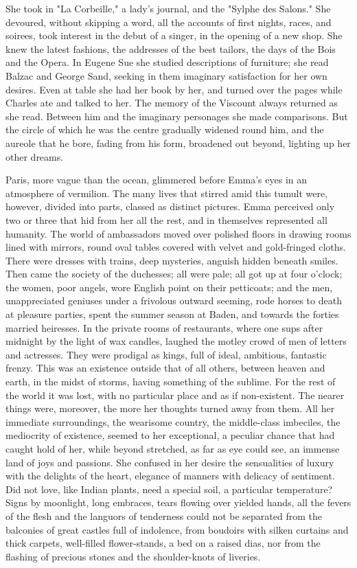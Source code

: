 \documentclass{tufte-book}
\begin{document}
She took in "La Corbeille," a lady's journal, and the "Sylphe des
Salons." She devoured, without skipping a word, all the accounts of
first nights, races, and soirees, took interest in the debut of a
singer, in the opening of a new shop. She knew the latest fashions, the
addresses of the best tailors, the days of the Bois and the Opera. In
Eugene Sue she studied descriptions of furniture; she read Balzac and
George Sand, seeking in them imaginary satisfaction for her own desires.
Even at table she had her book by her, and turned over the pages
while Charles ate and talked to her. The memory of the Viscount always
returned as she read. Between him and the imaginary personages she made
comparisons. But the circle of which he was the centre gradually widened
round him, and the aureole that he bore, fading from his form, broadened
out beyond, lighting up her other dreams.

Paris, more vague than the ocean, glimmered before Emma's eyes in an
atmosphere of vermilion. The many lives that stirred amid this tumult
were, however, divided into parts, classed as distinct pictures. Emma
perceived only two or three that hid from her all the rest, and in
themselves represented all humanity. The world of ambassadors moved over
polished floors in drawing rooms lined with mirrors, round oval tables
covered with velvet and gold-fringed cloths. There were dresses with
trains, deep mysteries, anguish hidden beneath smiles. Then came the
society of the duchesses; all were pale; all got up at four o'clock; the
women, poor angels, wore English point on their petticoats; and the men,
unappreciated geniuses under a frivolous outward seeming, rode horses to
death at pleasure parties, spent the summer season at Baden, and towards
the forties married heiresses. In the private rooms of restaurants,
where one sups after midnight by the light of wax candles, laughed the
motley crowd of men of letters and actresses. They were prodigal as
kings, full of ideal, ambitious, fantastic frenzy. This was an existence
outside that of all others, between heaven and earth, in the midst of
storms, having something of the sublime. For the rest of the world it
was lost, with no particular place and as if non-existent. The nearer
things were, moreover, the more her thoughts turned away from them.
All her immediate surroundings, the wearisome country, the middle-class
imbeciles, the mediocrity of existence, seemed to her exceptional, a
peculiar chance that had caught hold of her, while beyond stretched, as
far as eye could see, an immense land of joys and passions. She confused
in her desire the sensualities of luxury with the delights of the heart,
elegance of manners with delicacy of sentiment. Did not love, like
Indian plants, need a special soil, a particular temperature? Signs
by moonlight, long embraces, tears flowing over yielded hands, all
the fevers of the flesh and the languors of tenderness could not be
separated from the balconies of great castles full of indolence,
from boudoirs with silken curtains and thick carpets, well-filled
flower-stands, a bed on a raised dias, nor from the flashing of precious
stones and the shoulder-knots of liveries.
\end{document}
